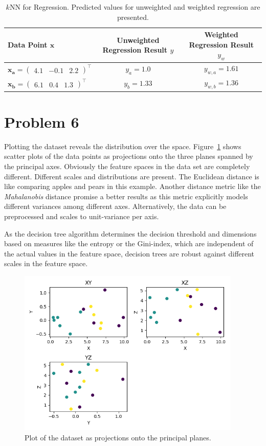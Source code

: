 \documentclass{scrartcl}
\begin{document}
\begin{table}[h]
	\centering

	\begin{tabular}{l|c|c}
	\hline

	\hline
	\textbf{Data Point} $\mathbf{x}$ & \textbf{Unweighted Regression Result} $y$ & \textbf{Weighted Regression Result} $y_w$\\
	\hline
		 $\mathbf{x_a} = \begin{pmatrix}
		 	4.1 & -0.1 & 2.2
		 \end{pmatrix}^\top$& $y_a = 1.0$ & $y_{w,a} = 1.61$\\
	\hline
		$\mathbf{x_b} = \begin{pmatrix}
			6.1 & 0.4 & 1.3
		\end{pmatrix}^\top$ & $y_b = 1.33$ & $y_{w,b} = 1.36$\\

	\hline
	\end{tabular}
	\caption{$k$NN for Regression. Predicted values for unweighted and weighted regression are presented.}
	\label{tab:class_predictions}
\end{table}

\section{Problem 6}
Plotting the dataset reveals the distribution over the space. Figure~\ref{fig:2d} shows scatter plots of the data points as projections onto the three planes spanned by the principal axes. Obviously the feature spaces in the data set are completely different. Different scales and distributions are present. The Euclidean distance is like comparing apples and pears in this example. Another distance metric like the \emph{Mahalanobis} distance promise a better results as this metric explicitly models different variances among different axes. Alternatively, the data can be preprocessed and scales to unit-variance per axis.

As the decision tree algorithm determines the decision threshold and dimensions based on measures like the entropy or the Gini-index, which are independent of the actual values in the feature space, decision trees are robust against different scales in the feature space.


\begin{figure}[h]
	\centering
	\includegraphics[height=8cm]{2d.png}
	\caption{Plot of the dataset as projections onto the principal planes.}
	\label{fig:2d}
\end{figure}


\end{document}
